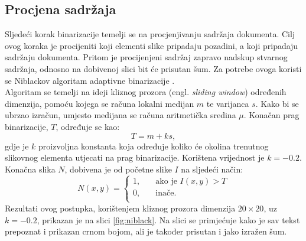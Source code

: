 \documentclass[times, utf8, zavrsni, numeric]{fer}
\begin{document}
\subsection{Procjena sadržaja}
Sljedeći korak binarizacije temelji se na procjenjivanju sadržaja dokumenta. 
Cilj ovog koraka je procijeniti koji elementi slike pripadaju pozadini, a koji pripadaju sadržaju dokumenta. 
Pritom je procijenjeni sadržaj zapravo nadskup stvarnog sadržaja, odnosno na dobivenoj slici bit će prisutan šum. 
Za potrebe ovoga koristi se Niblackov algoritam adaptivne binarizacije \cite{AdaptiveBinarization}.\\

Algoritam se temelji na ideji kliznog prozora (engl. \textit{sliding window}) određenih dimenzija, pomoću kojega se računa lokalni medijan  $m$ te varijanca $s$. 
Kako bi se ubrzao izračun, umjesto medijana se računa aritmetička sredina $\mu$.
Konačan prag binarizacije, $T$, određuje se kao:
\[ T = m + ks,\]
gdje je $k$ proizvoljna konstanta koja određuje koliko će okolina trenutnog slikovnog elementa utjecati na prag binarizacije.
Korištena vrijednost je $k = -0.2$.
Konačna slika $N$, dobivena je od početne slike $I$ na sljedeći način:
\[
    N(x, y) =
    \begin{cases}
        1,   & \quad \text{ako je } I(x, y) > T\\
        0,  & \quad \text{inače}.\\
    \end{cases}
\]
Rezultati ovog postupka, korištenjem kliznog prozora dimenzija $20\times20$, uz $k=-0.2$, prikazan je na slici \ref{fig:niblack}.
Na slici se primjećuje kako je sav tekst prepoznat i prikazan crnom bojom, ali je također prisutan i jako izražen šum.
\end{document}
